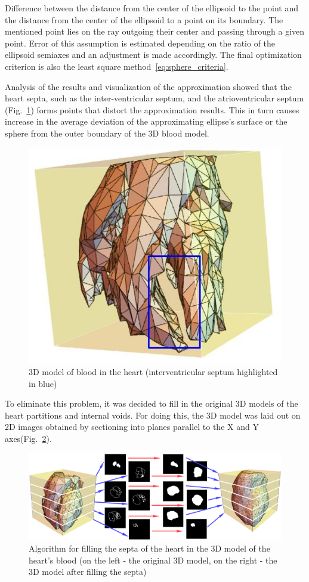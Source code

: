\documentclass[conference]{IEEEtran}
\begin{document}
Difference between the distance from the center of the ellipsoid to the point and the distance from the center of the ellipsoid to a point on its boundary.
The mentioned point lies on the ray outgoing their center and passing through a given point.
Error of this assumption is estimated depending on the ratio of the ellipsoid semiaxes and an adjustment is made accordingly.
The final optimization criterion is also the least square method~\ref{eq:sphere_criteria}.

Analysis of the results and visualization of the approximation showed that the heart septa, such as the inter-ventricular septum, and the atrioventricular septum
(Fig.~\ref{fig:wall})
forms points that distort the approximation results.
This in turn causes increase in the average deviation of the approximating ellipse's surface or the sphere from the outer boundary of the 3D blood model.

\begin{figure}[tbph]
    \centering
    \includegraphics[width=0.6\linewidth]{fig/wall}
    \caption{3D model of blood in the heart (interventricular septum highlighted in blue)}
    \label{fig:wall}
\end{figure}

To eliminate this problem, it was decided to fill in the original 3D models of the heart partitions and internal voids.
For doing this, the 3D model was laid out on 2D images obtained by sectioning into planes parallel to the X and Y axes(Fig.~\ref{fig:algo}).
\begin{figure}[tbph]
    \centering
    \includegraphics[width=\linewidth]{fig/algo}
    \caption{Algorithm for filling the septa of the heart in the 3D model of the heart's blood
    (on the left - the original 3D model, on the right - the 3D model after filling the septa)}
    \label{fig:algo}
\end{figure}
\end{document}
